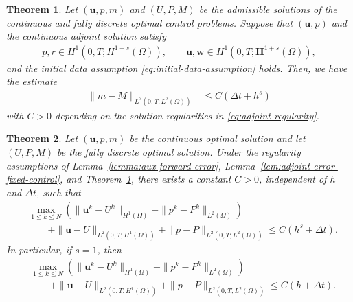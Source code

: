 \documentclass[10pt,a4paper]{amsart}
\newtheorem{theorem}{Theorem}
\begin{document}
\begin{theorem}\label{Theorem:5.8}
	Let $(\boldsymbol{u},p,m)$ and $(U,P,M)$ be the admissible solutions of the continuous and fully discrete optimal control problems. Suppose that $(\boldsymbol{u}, p)$ and the continuous adjoint solution satisfy
	\begin{align}\label{eq:adjoint-regularity}
		p, r \in H^1(0,T; H^{1+s}(\Omega)) ,
		\qquad
		\boldsymbol{u}, \boldsymbol{w} \in H^1(0,T; \boldsymbol{H}^{1+s}(\Omega)),
	\end{align}
    and the initial data assumption \eqref{eq:initial-data-assumption} holds. 
	Then, we have the estimate 
    \begin{align*}
		\|m-M\|_{L^2(0,T;L^2(\Omega))} &\le C (\Delta t + h^s)
	\end{align*}
    with $C>0$ depending on the solution regularities in \eqref{eq:adjoint-regularity}.
\end{theorem}

\begin{theorem}\label{Theorem:5.9}
Let $(\boldsymbol u,p,\bar m)$ be the continuous optimal solution and
let $(U,P,M)$ be the fully discrete optimal solution. Under the
regularity assumptions of Lemma~\ref{lemma:aux-forward-error},
Lemma~\ref{lem:adjoint-error-fixed-control}, and
Theorem~\ref{Theorem:5.8}, there exists a constant $C>0$, independent of
$h$ and $\Delta t$, such that
\[
\begin{aligned}
&\max_{1\le k\le N}
\left(
\|\boldsymbol u^k-U^k\|_{H^1(\Omega)}
+
\|p^k-P^k\|_{L^2(\Omega)}
\right)
\\
&\qquad
+
\|\boldsymbol u-U\|_{L^2(0,T;H^1(\Omega))}
+
\|p-P\|_{L^2(0,T;L^2(\Omega))}
\le
C(h^s+\Delta t).
\end{aligned}
\]
In particular, if $s=1$, then
\[
\begin{aligned}
&\max_{1\le k\le N}
\left(
\|\boldsymbol u^k-U^k\|_{H^1(\Omega)}
+
\|p^k-P^k\|_{L^2(\Omega)}
\right)
\\
&\qquad
+
\|\boldsymbol u-U\|_{L^2(0,T;H^1(\Omega))}
+
\|p-P\|_{L^2(0,T;L^2(\Omega))}
\le
C(h+\Delta t).
\end{aligned}
\]
\end{theorem}
\end{document}
